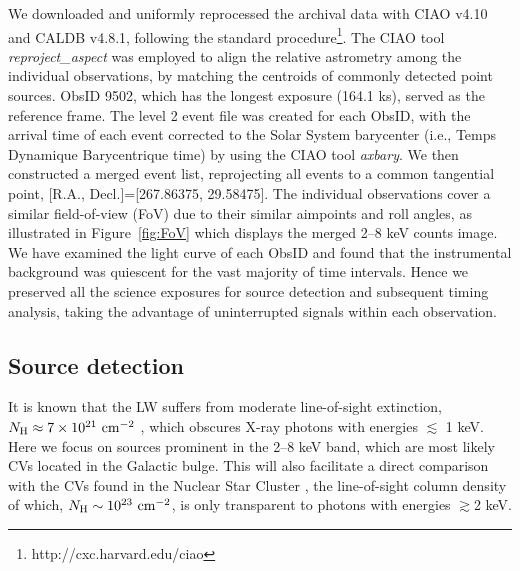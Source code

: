 \documentclass[fleqn,usenatbib]{mnras}
\begin{document}
We downloaded and uniformly reprocessed the archival data with CIAO v4.10 and CALDB v4.8.1, following the standard procedure\footnote{http://cxc.harvard.edu/ciao}.
The CIAO tool \emph{reproject\_aspect} was employed to align the relative astrometry among the individual observations, by matching the centroids of commonly detected point sources. ObsID 9502, which has the longest exposure (164.1 ks), served as the reference frame.
The level 2 event file was created for each ObsID, with the arrival time of each event corrected to the Solar System barycenter (i.e., Temps Dynamique Barycentrique time) by using the CIAO tool \emph{axbary}.
We then constructed a merged event list, reprojecting all events to a common tangential point, [R.A., Decl.]=[267.86375, 29.58475].
The individual observations cover a similar field-of-view (FoV) due to their similar aimpoints and roll angles, as illustrated in Figure~\ref{fig:FoV} which displays the merged 2--8 keV counts image.
We have examined the light curve of each ObsID and found that the instrumental background was quiescent for the vast majority of time intervals.
Hence we preserved all the science exposures for source detection and subsequent timing analysis, taking the advantage of uninterrupted signals within each observation.  
\subsection{Source detection}\label{subsec:detect}
It is known that the LW suffers from moderate line-of-sight extinction, $N_{\rm H} \approx 7\times10^{21}{\rm~cm^{-2}}$ \citep{2011MNRAS.414..495R}, which obscures X-ray photons with energies $\lesssim$ 1 keV.
Here we focus on sources prominent in the 2--8 keV band, which are most likely CVs located in the Galactic bulge. This will also facilitate a direct comparison with the CVs found in the Nuclear Star Cluster \citep{2018ApJS..235...26Z}, the line-of-sight column density of which, $N_{\rm H} \sim 10^{23}{\rm~cm^{-2}}$, is only transparent to photons with energies $\gtrsim$2 keV. 
\end{document}

